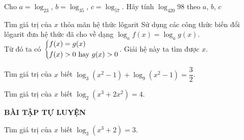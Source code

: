 \begin{bt}%
    Cho $a=\log_23$, $b=\log_35$, $c=\log_57$. Hãy tính $\log_{420}98$ theo $a$, $b$, $c$
\end{bt}

\begin{dang}{Tìm giá trị của $x$ thỏa mãn hệ thức lôgarit}
    Sử dụng các công thức biến đổi lôgarit đưa hệ thức đã cho về dạng $\log_af(x)=\log_ag(x)$.\\
    Từ đó ta có $\left\{\begin{aligned}&f(x)=g(x)\\&f(x)>0\, \, \text{hay}\,\, g(x)>0\end{aligned}\right.$.
    Giải hệ này ta tìm được $x$.
\end{dang}

\begin{vd}%
    Tìm giá trị của $x$ biết $\log_3\left(x^2-1\right)+\log_9\left(x^2-1\right)=\dfrac{3}{2}$.
\end{vd}

\begin{vd}%
    Tìm giá trị của $x$ biết $\log_2\left(x^3+2x^2\right)=4$.
\end{vd}
\begin{center}
    \textbf{BÀI TẬP TỰ LUYỆN}
\end{center}

\begin{bt}%
    Tìm giá trị của $x$ biết $\log_3\left(x^3+2\right)=3$.
\end{bt}

